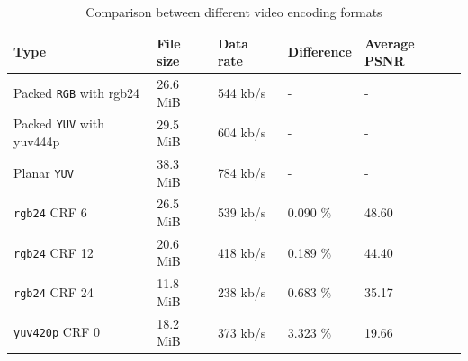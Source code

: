 \begin{table}[t]
  \centering
  \begin{tabular}{l|l|l|l|l}
    \hline
    \textbf{Type} & \textbf{File size} & \textbf{Data rate} & \textbf{Difference} & \textbf{Average PSNR} \\ \hline
    \hline
    Packed \texttt{RGB} with rgb24     & 26.6 MiB  & 544 kb/s  & -         & -         \\ \hline
    Packed \texttt{YUV} with yuv444p    & 29.5 MiB  & 604 kb/s  & -         & -         \\ \hline
    Planar \texttt{YUV}     & 38.3 MiB  & 784 kb/s  & -         & -         \\ \hline
    \hline
    \texttt{rgb24} CRF 6    & 26.5 MiB  & 539 kb/s  & 0.090 \%  & 48.60     \\ \hline
    \texttt{rgb24} CRF 12   & 20.6 MiB  & 418 kb/s  & 0.189 \%  & 44.40     \\ \hline
    \texttt{rgb24} CRF 24   & 11.8 MiB  & 238 kb/s  & 0.683 \%  & 35.17     \\ \hline
    \texttt{yuv420p} CRF 0  & 18.2 MiB  & 373 kb/s  & 3.323 \%  & 19.66     \\ \hline
  \end{tabular}
  \caption{\footnotesize Comparison between different video encoding formats}
  \label{tbl:video_format}
\end{table}
